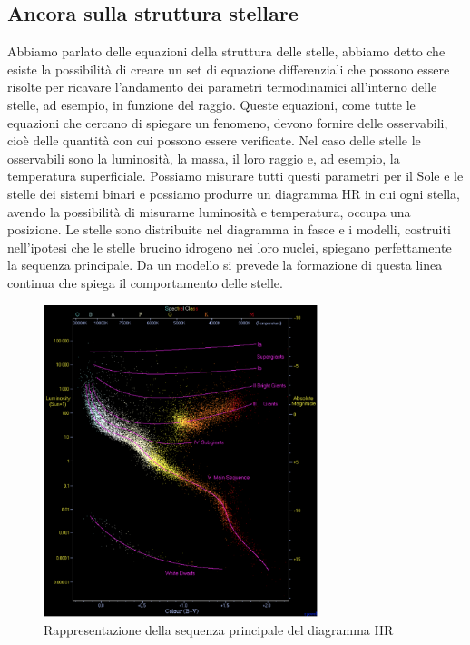 \documentclass[a4paper,11pt]{article}
\begin{document}
\subsection{Ancora sulla struttura stellare}
    Abbiamo parlato delle equazioni della struttura delle stelle, abbiamo detto che esiste la possibilità di creare un set di equazione differenziali che possono essere risolte per ricavare l'andamento dei parametri termodinamici all'interno delle stelle, ad esempio, in funzione del raggio. Queste equazioni, come tutte le equazioni che cercano di spiegare un fenomeno, devono fornire delle osservabili, cioè delle quantità con cui possono essere verificate. Nel caso delle stelle le osservabili sono la luminosità, la massa, il loro raggio e, ad esempio, la temperatura superficiale. Possiamo misurare tutti questi parametri per il Sole e le stelle dei sistemi binari e possiamo produrre un diagramma HR in cui ogni stella, avendo la possibilità di misurarne luminosità e temperatura, occupa una posizione. Le stelle sono distribuite nel diagramma in fasce e i modelli, costruiti nell'ipotesi che le stelle brucino idrogeno nei loro nuclei, spiegano perfettamente la sequenza principale. Da un modello si prevede la formazione di questa linea continua che spiega il comportamento delle stelle.\\
    
    \begin{figure}[h!!]
        \centering
        \includegraphics[width=8cm]{Diagramma HR.png}
        \caption{Rappresentazione della sequenza principale del diagramma HR}
        \label{fig:Diagramma HR.png}
    \end{figure}
    
\end{document}
